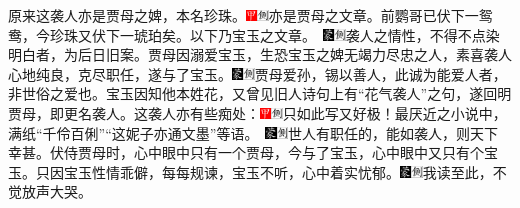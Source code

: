 {原来这袭人亦是贾母之婢，本名珍珠。{{\includegraphics[width=3mm]{../Images/00002}\includegraphics[width=3mm]{../Images/00011}\footnotesize \kaishu 亦是贾母之文章。前鹦哥已伏下一鸳鸯，今珍珠又伏下一琥珀矣。以下乃宝玉之文章。　}\includegraphics[width=3mm]{../Images/00006}\includegraphics[width=3mm]{../Images/00011}\footnotesize \kaishu 袭人之情性，不得不点染明白者，为后日旧案。}贾母因溺爱宝玉，生恐宝玉之婢无竭力尽忠之人，素喜袭人心地纯良，克尽职任，遂与了宝玉。{\includegraphics[width=3mm]{../Images/00006}\includegraphics[width=3mm]{../Images/00011}\footnotesize \kaishu 贾母爱孙，锡以善人，此诚为能爱人者，非世俗之爱也。}宝玉因知他本姓花，又曾见旧人诗句上有“花气袭人”之句，遂回明贾母，即更名袭人。这袭人亦有些痴处：{{\includegraphics[width=3mm]{../Images/00002}\includegraphics[width=3mm]{../Images/00011}\footnotesize \kaishu 只如此写又好极！最厌近之小说中，满纸“千伶百俐”“这妮子亦通文墨”等语。　}\includegraphics[width=3mm]{../Images/00006}\includegraphics[width=3mm]{../Images/00011}\footnotesize \kaishu 世人有职任的，能如袭人，则天下幸甚。}伏侍贾母时，心中眼中只有一个贾母，今与了宝玉，心中眼中又只有个宝玉。只因宝玉性情乖僻，每每规谏，宝玉不听，心中着实忧郁。{\includegraphics[width=3mm]{../Images/00006}\includegraphics[width=3mm]{../Images/00011}\footnotesize \kaishu 我读至此，不觉放声大哭。}

}

